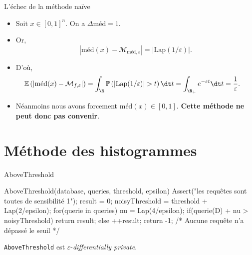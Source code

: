 \documentclass[10pt,serif]{beamer}
\begin{document}
  \begin{frame}{L'échec de la méthode naïve}
    \begin{itemize}
      \item<1-> Soit \(x \in [0,1]^n\). On a \(\Delta\text{méd} = 1\).\\
      \item<2->  Or,   \[
        |\text{méd}(x) - \mathcal M_{\text{méd}, \varepsilon}| = |\text{Lap}(1/\varepsilon)|.    
      \] 

      \item<3->  D'où,  \begin{align*}
          \mathbb E\left( |\text{méd}(x) - \mathcal M_{f, \varepsilon}| \right) & = \int_{\R} \mathbb P \left( |\text{Lap}(1/\varepsilon)| > t \right) \dt t = \int_{\R_+} e^{-\varepsilon t}  \dt t = \dfrac{1}{\varepsilon}.
        \end{align*} 

      \item<4-> Néanmoins nous avons forcement \(\text{méd}(x) \in [0,1]\). \textbf{Cette méthode ne peut donc pas convenir}.
    \end{itemize}
  \end{frame}



\section{Méthode des histogrammes}
  \begin{frame}[containsverbatim]{AboveThreshold \cite{10.1007/11681878_14}}
    \begin{code}
  AboveThreshold(database, queries, threshold, epsilon){
    Assert("les requêtes sont toutes de sensibilité 1");
    result = 0;
    noisyThreshold = threshold + Lap(2/epsilon);
    for(querie in queries){
        nu = Lap(4/epsilon);
        if(querie(D) + nu > noisyThreshold)
            return result;
        else
            ++result; 
    }
    return -1; /* Aucune requête n'a dépassé le seuil */
  }
    \end{code}
    \begin{theorem}
      \texttt{AboveThreshold} est \(\varepsilon\)-\textit{differentially private}.
    \end{theorem}
  \end{frame} 
\end{document}
